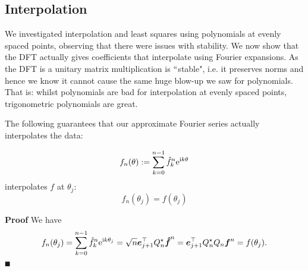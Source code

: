\subsection{Interpolation}
We investigated  interpolation and least squares using polynomials at evenly spaced points, observing that there were issues with stability. We now show that the DFT actually gives coefficients that interpolate using Fourier expansions. As the DFT is a unitary matrix multiplication is \ensuremath{\ldq}stable", i.e. it preserves norms and hence we know it cannot cause the same huge blow-up we saw for polynomials. That is: whilst polynomials are bad for interpolation at evenly spaced points, trigonometric polynomials are great. 

The following guarantees that our approximate Fourier series actually interpolates the data:

\begin{corollary}[Interpolation]
\[
f_n(\theta) := \sum_{k=0}^{n-1} \hat f_k^n {\rm e}^{{\rm i} k \theta}
\]
interpolates $f$ at $\ensuremath{\theta}_j$:
\[
f_n(\ensuremath{\theta}_j) = f(\ensuremath{\theta}_j)
\]
\end{corollary}
\textbf{Proof} We have
\[
f_n(\theta_j) = \sum_{k=0}^{n-1} \hat f_k^n {\rm e}^{{\rm i} k \theta_j} = \sqrt n \bm{{\mbox{\boldmath$e$\unboldmath}}}_{j+1}^\top Q_n^\star {\mbox{\boldmath$\hat f$\unboldmath}}^n = \bm{{\mbox{\boldmath$e$\unboldmath}}}_{j+1}^\top Q_n^\star Q_n \bm{{\mbox{\boldmath$f$\unboldmath}}}^n = f(\theta_j).
\]
\ensuremath{\QED}

